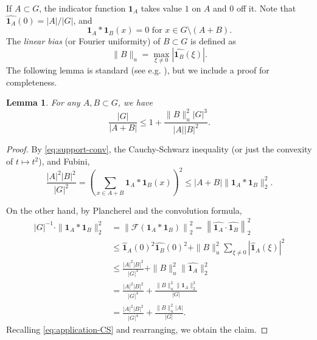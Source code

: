 \documentclass[12pt]{amsart}
\newtheorem{lemma}[theorem]{Lemma}
\numberwithin{theorem}{section}
\numberwithin{equation}{section}
\begin{document}
If $A\subset G$, the indicator function $\mathbf{1}_A$ takes value $1$ on $A$ and $0$ off it. Note that $\widehat{\mathbf{1}_A}(0) = |A|/|G|$, and
\begin{equation} \label{eq:support-conv}
    \mathbf{1}_A*\mathbf{1}_B(x)=0 \text{ for } x\in G\setminus (A+B).
\end{equation}
The \emph{linear bias} (or Fourier uniformity) of $B\subset G$ is defined as
\[
    \|B\|_u = \max_{\xi\neq 0} |\widehat{\mathbf{1}_B}(\xi)|.
\]
The following lemma is standard (see e.g. \cite[Exercise 4.3.7]{TaoVu06}), but we include a proof for completeness.
\begin{lemma} \label{lem:bias-to-sumset}
   For any $A,B\subset G$, we have
   \[
     \frac{|G|}{|A+B|} \le 1+\frac{\|B\|_u^2 |G|^3}{|A||B|^2}.
   \]
\end{lemma}
\begin{proof}
By \eqref{eq:support-conv}, the Cauchy-Schwarz inequality (or just the convexity of $t\mapsto t^2$), and Fubini,
\begin{equation} \label{eq:application-CS}
    \frac{|A|^2|B|^2}{|G|^2} = \left(\sum_{x\in A+B} \mathbf{1}_A*\mathbf{1}_B(x)\right)^2 \le |A+B| \|\mathbf{1}_A*\mathbf{1}_B\|_2^2.
\end{equation}

On the other hand, by Plancherel and the convolution formula,
\begin{align*}
    |G|^{-1}\cdot \|\mathbf{1}_A*\mathbf{1}_B\|_2^2 &= \left\|\mathcal{F}\left(\mathbf{1}_A*\mathbf{1}_B\right)\right\|_2^2  =  \left\| \widehat{\mathbf{1}_A}\cdot \widehat{\mathbf{1}_B} \right\|_2^2 \\
 &\le \widehat{\mathbf{1}}_A(0)^2 \widehat{\mathbf{1}_B}(0)^2 + \|B\|_u^2 \sum_{\xi\neq 0} |\widehat{\mathbf{1}}_A(\xi)|^2 \\
 &\le \frac{|A|^2|B|^2}{|G|^4}  + \|B\|_u^2 \|\widehat{\mathbf{1}_A}\|_2^2 \\
 &= \frac{|A|^2|B|^2}{|G|^4} + \frac{\|B\|_u^2\|\mathbf{1}_A\|_2^2}{|G|} \\
 &= \frac{|A|^2|B|^2}{|G|^4} + \frac{\|B\|_u^2 |A|}{|G|}.
\end{align*}
Recalling \eqref{eq:application-CS} and rearranging, we obtain the claim.
\end{proof}
\end{document}
